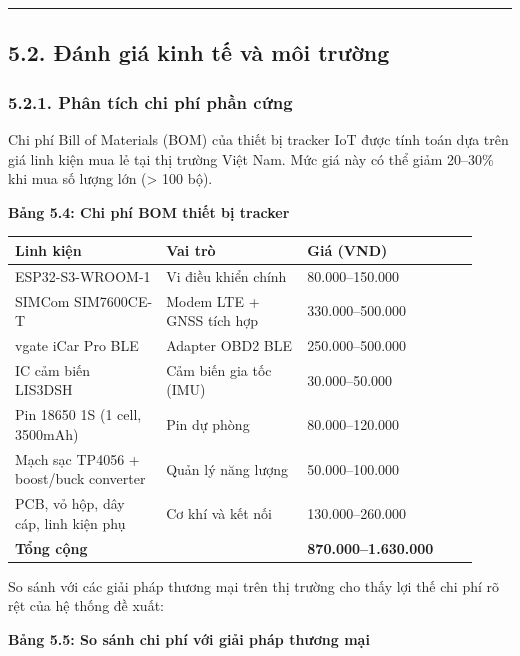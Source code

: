 \documentclass[13pt,a4paper]{extarticle}
\newcounter{none} %
\newcommand{\thesislongtableorignewline}{}
\let\thesislongtableorignewline\\
\renewcommand{\\}{\thesislongtableorignewline\hline}%
\let\\\thesislongtableorignewline
\newcommand{\thesistabletitle}[1]{%
  \begin{center}\textbf{#1}\end{center}%
}
\begin{document}
\begin{center}\rule{0.5\linewidth}{0.5pt}\end{center}

\subsection{5.2. Đánh giá kinh tế và môi
trường}\label{52-ux111uxe1nh-giuxe1-kinh-tux1ebf-vuxe0-muxf4i-trux1b0ux1eddng}

\subsubsection{5.2.1. Phân tích chi phí phần
cứng}\label{521-phuxe2n-tuxedch-chi-phuxed-phux1ea7n-cux1ee9ng}

Chi phí Bill of Materials (BOM) của thiết bị tracker IoT được tính toán
dựa trên giá linh kiện mua lẻ tại thị trường Việt Nam. Mức giá này có
thể giảm 20--30\% khi mua số lượng lớn (\textgreater{} 100 bộ).

\thesistabletitle{Bảng 5.4: Chi phí BOM thiết bị tracker}

{\def\LTcaptype{none} %
\begin{longtable}{|p{0.30\linewidth}|p{0.28\linewidth}|p{0.34\linewidth}|}
\hline \textbf{Linh kiện} & \textbf{Vai trò} & \textbf{Giá (VND)} \\
\hline
\endhead
\hline
\endlastfoot
ESP32-S3-WROOM-1 & Vi điều khiển chính & 80.000--150.000 \\
SIMCom SIM7600CE-T & Modem LTE + GNSS tích hợp & 330.000--500.000 \\
vgate iCar Pro BLE & Adapter OBD2 BLE & 250.000--500.000 \\
IC cảm biến LIS3DSH & Cảm biến gia tốc (IMU) & 30.000--50.000 \\
Pin 18650 1S (1 cell, 3500mAh) & Pin dự phòng & 80.000--120.000 \\
Mạch sạc TP4056 + boost/buck converter & Quản lý năng lượng &
50.000--100.000 \\
PCB, vỏ hộp, dây cáp, linh kiện phụ & Cơ khí và kết nối &
130.000--260.000 \\
\textbf{Tổng cộng} & & \textbf{870.000--1.630.000} \\
\end{longtable}
}

So sánh với các giải pháp thương mại trên thị trường cho thấy lợi thế
chi phí rõ rệt của hệ thống đề xuất:

\thesistabletitle{Bảng 5.5: So sánh chi phí với giải pháp thương mại}
\end{document}
